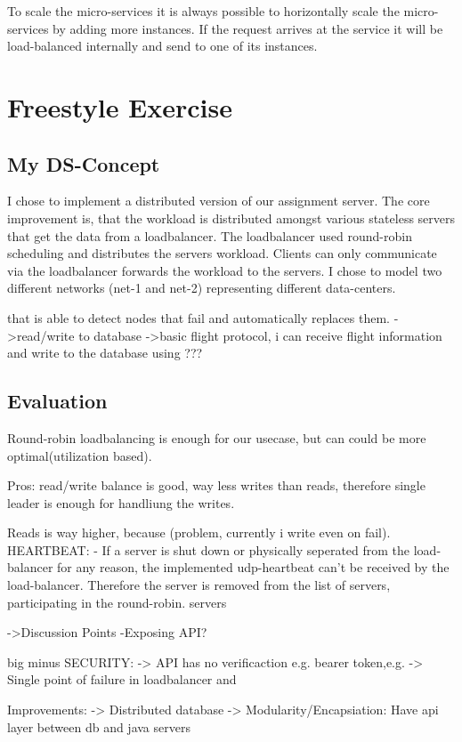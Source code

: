 \documentclass{article}
\begin{document}
To scale the micro-services it is always possible to horizontally scale the micro-services by adding more instances. If the request arrives at the service it will be load-balanced internally and send to one of its instances.


\section{Freestyle Exercise}
\subsection{My DS-Concept}
I chose to implement a distributed version of our assignment server. 
The core improvement is, that the workload is distributed amongst various stateless servers that get the data from a loadbalancer. The loadbalancer used round-robin scheduling and distributes the servers workload.
Clients can only communicate via the loadbalancer forwards the workload to the servers. I chose to model two different networks (net-1 and net-2) representing different data-centers. 

that is able to detect nodes that fail and automatically replaces them.
->read/write to database 
->basic flight protocol, i can receive flight information and write to the database using ???

\subsection{Evaluation}
Round-robin loadbalancing is enough for our usecase, but can could be more optimal(utilization based).

Pros:
read/write balance is good, way less writes than reads, therefore single leader is enough for handliung the writes.

Reads is way higher, because (problem, currently i write even on fail). 
HEARTBEAT:
- If a server is shut down or physically seperated from the load-balancer for any reason, the implemented udp-heartbeat can't be received by the load-balancer. Therefore the server is removed from the list of servers, participating in the round-robin.
servers



->Discussion Points
-Exposing API?

big minus SECURITY:
-> API has no verificaction e.g. bearer token,e.g.
-> Single point of failure in loadbalancer and 

Improvements:
-> Distributed database 
-> Modularity/Encapsiation: Have api layer between db and java servers

\printbibliography[heading=bibintoc]
\end{document}
